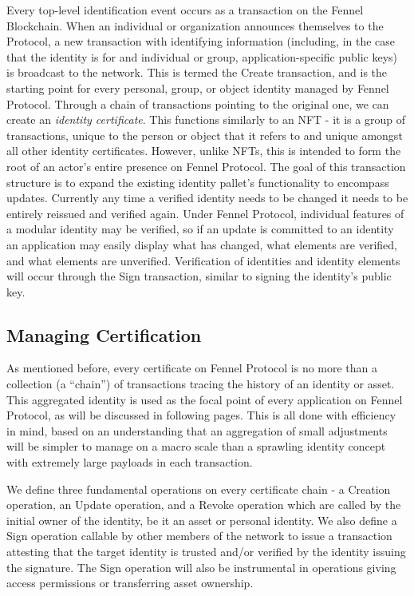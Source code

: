 \documentclass[]{article}
\begin{document}
Every top-level identification event occurs as a transaction on the Fennel Blockchain. When an individual or organization announces themselves to the Protocol, a new transaction with identifying information (including, in the case that the identity is for and individual or group, application-specific public keys) is broadcast to the network. This is termed the Create transaction, and is the starting point for every personal, group, or object identity managed by Fennel Protocol. Through a chain of transactions pointing to the original one, we can create an \textit{identity certificate}. This functions similarly to an NFT - it is a group of transactions, unique to the person or object that it refers to and unique amongst all other identity certificates. However, unlike NFTs, this is intended to form the root of an actor's entire presence on Fennel Protocol.
The goal of this transaction structure is to expand the existing identity pallet's functionality to encompass updates. Currently any time a verified identity needs to be changed it needs to be entirely reissued and verified again. Under Fennel Protocol, individual features of a modular identity may be verified, so if an update is committed to an identity an application may easily display what has changed, what elements are verified, and what elements are unverified. Verification of identities and identity elements will occur through the Sign transaction, similar to signing the identity's public key.

\subsection{Managing Certification}
\label{scrivauto:12}

As mentioned before, every certificate on Fennel Protocol is no more than a collection (a ``chain'') of transactions tracing the history of an identity or asset. This aggregated identity is used as the focal point of every application on Fennel Protocol, as will be discussed in following pages. This is all done with efficiency in mind, based on an understanding that an aggregation of small adjustments will be simpler to manage on a macro scale than a sprawling identity concept with extremely large payloads in each transaction.

We define three fundamental operations on every certificate chain - a Creation operation, an Update operation, and a Revoke operation which are called by the initial owner of the identity, be it an asset or personal identity. We also define a Sign operation callable by other members of the network to issue a transaction attesting that the target identity is trusted and/or verified by the identity issuing the signature. The Sign operation will also be instrumental in operations giving access permissions or transferring asset ownership.
\end{document}

